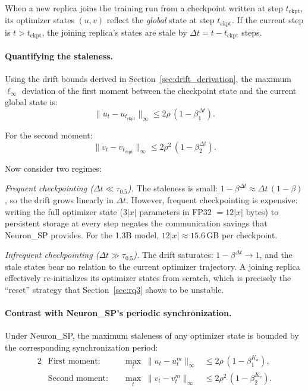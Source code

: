 \documentclass{article}
\begin{document}
When a new replica joins the training run from a checkpoint written at
step $t_{\text{ckpt}}$, its optimizer states $(u, v)$ reflect the
\emph{global} state at step $t_{\text{ckpt}}$. If the current step is
$t > t_{\text{ckpt}}$, the joining replica's states are stale by
$\Delta t = t - t_{\text{ckpt}}$ steps.

\paragraph{Quantifying the staleness.}
Using the drift bounds derived in Section~\ref{sec:drift_derivation},
the maximum $\ell_\infty$ deviation of the first moment between the
checkpoint state and the current global state is:
\begin{equation}
\|u_t - u_{t_{\text{ckpt}}}\|_\infty
\leq 2\rho\,(1 - \beta_1^{\Delta t}).
\label{eq:ckpt_drift_u}
\end{equation}

For the second moment:
\begin{equation}
\|v_t - v_{t_{\text{ckpt}}}\|_\infty
\leq 2\rho^2\,(1 - \beta_2^{\Delta t}).
\label{eq:ckpt_drift_v}
\end{equation}

Now consider two regimes:

\medskip
\noindent\emph{Frequent checkpointing ($\Delta t \ll \tau_{0.5}$).}
The staleness is small: $1 - \beta^{\Delta t} \approx \Delta t\,(1-\beta)$,
so the drift grows linearly in $\Delta t$. However, frequent checkpointing
is expensive: writing the full optimizer state ($3|x|$ parameters in
FP32 $= 12|x|$ bytes) to persistent storage at every step negates the
communication savings that Neuron\_SP provides. For the 1.3B model,
$12|x| \approx 15.6$\,GB per checkpoint.

\medskip
\noindent\emph{Infrequent checkpointing ($\Delta t \gg \tau_{0.5}$).}
The drift saturates: $1 - \beta^{\Delta t} \to 1$, and the stale states
bear no relation to the current optimizer trajectory. A joining replica
effectively re-initializes its optimizer states from scratch, which is
precisely the ``reset'' strategy that
Section~\ref{sec:rq3} shows to be unstable.

\paragraph{Contrast with Neuron\_SP's periodic synchronization.}
Under Neuron\_SP, the maximum staleness of any optimizer state is bounded
by the corresponding synchronization period:
\begin{alignat}{2}
&\text{First moment:}\quad&
\max_t\;\|u_t - u_t^m\|_\infty
&\leq 2\rho\,(1 - \beta_1^{K_u}),
\label{eq:ckpt_nsp_u} \\[4pt]
&\text{Second moment:}\quad&
\max_t\;\|v_t - v_t^m\|_\infty
&\leq 2\rho^2\,(1 - \beta_2^{K_v}).
\label{eq:ckpt_nsp_v}
\end{alignat}
\end{document}
